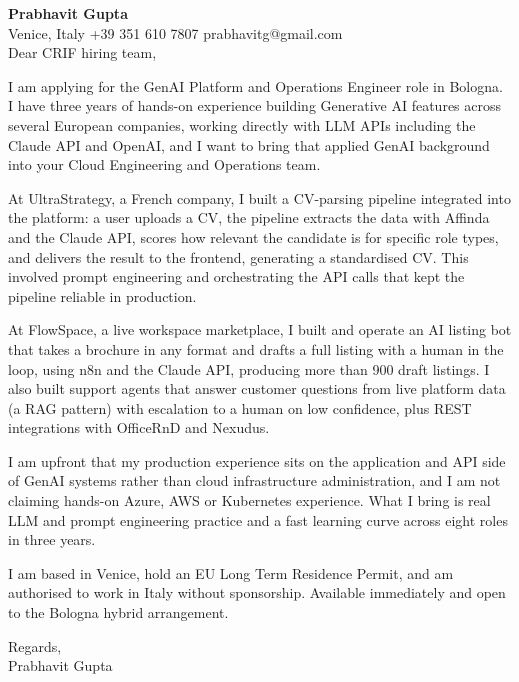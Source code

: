 \documentclass[a4paper,10.5pt]{article}
\begin{document}
\textbf{Prabhavit Gupta}\\
Venice, Italy \textbar{} +39 351 610 7807 \textbar{} prabhavitg@gmail.com\\[10pt]
Dear CRIF hiring team,

I am applying for the GenAI Platform and Operations Engineer role in Bologna. I have three years of hands-on experience building Generative AI features across several European companies, working directly with LLM APIs including the Claude API and OpenAI, and I want to bring that applied GenAI background into your Cloud Engineering and Operations team.

At UltraStrategy, a French company, I built a CV-parsing pipeline integrated into the platform: a user uploads a CV, the pipeline extracts the data with Affinda and the Claude API, scores how relevant the candidate is for specific role types, and delivers the result to the frontend, generating a standardised CV. This involved prompt engineering and orchestrating the API calls that kept the pipeline reliable in production.

At FlowSpace, a live workspace marketplace, I built and operate an AI listing bot that takes a brochure in any format and drafts a full listing with a human in the loop, using n8n and the Claude API, producing more than 900 draft listings. I also built support agents that answer customer questions from live platform data (a RAG pattern) with escalation to a human on low confidence, plus REST integrations with OfficeRnD and Nexudus.

I am upfront that my production experience sits on the application and API side of GenAI systems rather than cloud infrastructure administration, and I am not claiming hands-on Azure, AWS or Kubernetes experience. What I bring is real LLM and prompt engineering practice and a fast learning curve across eight roles in three years.

I am based in Venice, hold an EU Long Term Residence Permit, and am authorised to work in Italy without sponsorship. Available immediately and open to the Bologna hybrid arrangement.

Regards,\\
Prabhavit Gupta
\end{document}
